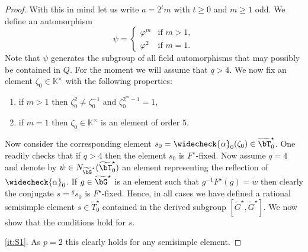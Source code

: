 \documentclass[eqthmnum, nocolour]{jt-calcs}
\begin{document}
\begin{proof}
With this in mind let us write $a = 2^tm$ with $t \geqslant 0$ and $m \geqslant 1$ odd. We define an automorphism
\begin{equation*}
\psi = \begin{cases}
\varphi^m &\text{if }m > 1,\\
\varphi^2 &\text{if }m = 1.
\end{cases}
\end{equation*}
Note that $\psi$ generates the subgroup of all field automorphisms that may possibly be contained in $Q$. For the moment we will assume that $q > 4$. We now fix an element $\zeta_0 \in \mathbb{K}^{\times}$ with the following properties:
\begin{enumerate}[label=(\roman*)]
	\item if $m > 1$ then $\zeta_0^2 \neq \zeta_0^{-1}$ and $\zeta_0^{2^m-1} = 1$,
	\item if $m=1$ then $\zeta_0 \in \mathbb{K}^{\times}$ is an element of order $5$.
\end{enumerate}
Now consider the corresponding element $s_0 = \widecheck{\alpha}_0(\zeta_0) \in \widetilde{\bT}_0^{\star}$. One readily checks that if $q > 4$ then the element $s_0$ is $F^{\star}$-fixed. Now assume $q = 4$ and denote by $\dot{w} \in N_{\widetilde{\bG}^{\star}}(\widetilde{\bT}_0^{\star})$ an element representing the reflection of $\widecheck{\alpha}_0$. If $g \in \widetilde{\bG}^{\star}$ is an element such that $g^{-1}F^{\star}(g) = \dot{w}$ then clearly the conjugate $s = {}^gs_0$ is $F^{\star}$-fixed. Hence, in all cases we have defined a rational semisimple element $s \in \widetilde{T}_0^{\star}$ contained in the derived subgroup $[\widetilde{G}^{\star},\widetilde{G}^{\star}]$. We now show that the conditions  hold for $s$.

\cref{it:S1}. As $p=2$ this clearly holds for any semisimple element.


\end{proof}
\end{document}
